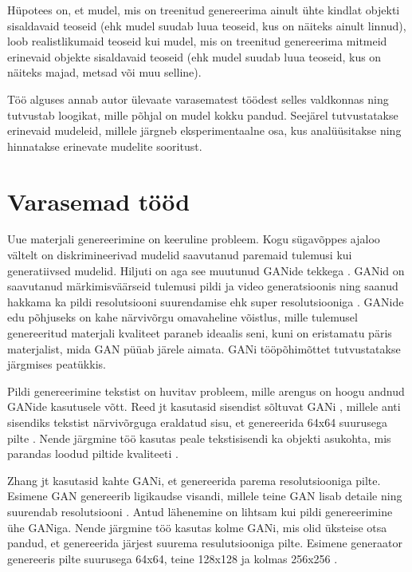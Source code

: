 \documentclass{vilgym}
\begin{document}
	Hüpotees on, et mudel, mis on treenitud genereerima ainult ühte kindlat objekti sisaldavaid teoseid (ehk mudel suudab luua teoseid, kus on näiteks ainult linnud), loob realistlikumaid teoseid kui mudel, mis on treenitud genereerima mitmeid erinevaid objekte sisaldavaid teoseid (ehk mudel suudab luua teoseid, kus on näiteks majad, metsad või muu selline).

	Töö alguses annab autor ülevaate varasematest töödest selles valdkonnas ning tutvustab loogikat, mille põhjal on mudel kokku pandud. Seejärel tutvustatakse erinevaid mudeleid, millele järgneb eksperimentaalne osa, kus analüüsitakse ning hinnatakse erinevate mudelite sooritust. 
	
	\section{Varasemad tööd}

	Uue materjali genereerimine on keeruline probleem. Kogu sügavõppes ajaloo vältelt on diskrimineerivad mudelid saavutanud paremaid tulemusi kui generatiivsed mudelid. Hiljuti on aga see muutunud GANide tekkega \parencite{gan}. GANid on saavutanud märkimisväärseid tulemusi pildi \parencite{biggan} ja video generatsioonis \parencite{dvdgan} ning saanud hakkama ka pildi resolutsiooni suurendamise ehk super resolutsiooniga \parencite{srgan}. GANide edu põhjuseks on kahe närvivõrgu omavaheline võistlus, mille tulemusel genereeritud materjali kvaliteet paraneb ideaalis seni, kuni on eristamatu päris materjalist, mida GAN püüab järele aimata. GANi tööpõhimõttet tutvustatakse järgmises peatükkis.

	Pildi genereerimine tekstist on huvitav probleem, mille arengus on hoogu andnud GANide kasutusele võtt. Reed jt kasutasid sisendist sõltuvat GANi , millele anti sisendiks tekstist närvivõrguga eraldatud sisu, et genereerida 64x64 suurusega pilte \parencite{reed}. Nende järgmine töö kasutas peale tekstisisendi ka objekti asukohta, mis parandas loodud piltide kvaliteeti \parencite{reed2}. 

	Zhang jt kasutasid kahte GANi, et genereerida parema resolutsiooniga pilte. Esimene GAN genereerib ligikaudse visandi, millele teine GAN lisab detaile ning suurendab resolutsiooni \parencite{stackgan}. Antud lähenemine on lihtsam kui pildi genereerimine ühe GANiga. Nende järgmine töö kasutas kolme GANi, mis olid üksteise otsa pandud, et genereerida järjest suurema resulutsiooniga pilte. Esimene generaator genereeris pilte suurusega 64x64, teine 128x128 ja kolmas 256x256 \parencite{stackgan2}.
\end{document}
